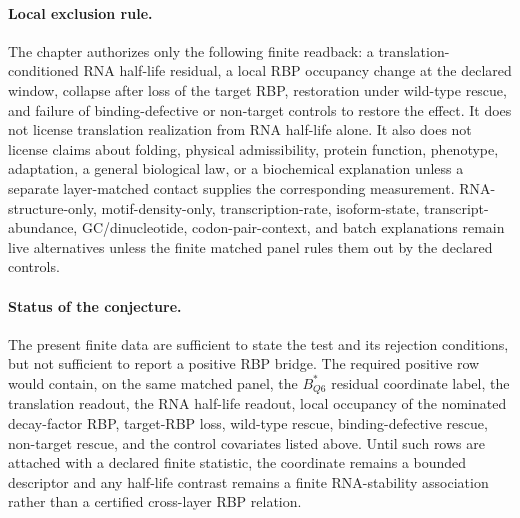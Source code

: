 \paragraph{Local exclusion rule.}
The chapter authorizes only the following finite readback: a translation-conditioned RNA half-life residual, a local RBP occupancy change at the declared window, collapse after loss of the target RBP, restoration under wild-type rescue, and failure of binding-defective or non-target controls to restore the effect.  It does not license translation realization from RNA half-life alone.  It also does not license claims about folding, physical admissibility, protein function, phenotype, adaptation, a general biological law, or a biochemical explanation unless a separate layer-matched contact supplies the corresponding measurement.  RNA-structure-only, motif-density-only, transcription-rate, isoform-state, transcript-abundance, GC/dinucleotide, codon-pair-context, and batch explanations remain live alternatives unless the finite matched panel rules them out by the declared controls.

\paragraph{Status of the conjecture.}
The present finite data are sufficient to state the test and its rejection conditions, but not sufficient to report a positive RBP bridge.  The required positive row would contain, on the same matched panel, the $B^*_{Q6}$ residual coordinate label, the translation readout, the RNA half-life readout, local occupancy of the nominated decay-factor RBP, target-RBP loss, wild-type rescue, binding-defective rescue, non-target rescue, and the control covariates listed above.  Until such rows are attached with a declared finite statistic, the coordinate remains a bounded descriptor and any half-life contrast remains a finite RNA-stability association rather than a certified cross-layer RBP relation.
